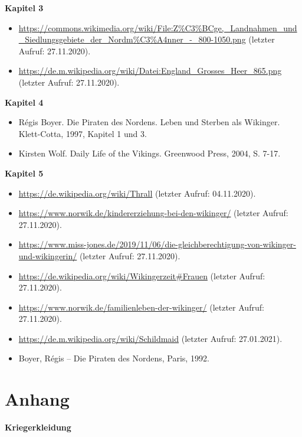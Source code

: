 \documentclass[12pt,a4paper,ngerman,openany]{book}
\newcommand\blankpage{\null \thispagestyle{empty} \addtocounter{page}{-1} \newpage}
\newcommand{\timage}[1]{\framebox{\texttt{[image: \#1]}}} %
\begin{document}
\textbf{Kapitel 3}
\begin{itemize}
  \item \url{https://commons.wikimedia.org/wiki/File:Z\%C3\%BCge,_Landnahmen_und_Siedlungsgebiete_der_Nordm\%C3\%A4nner_-_800-1050.png} (letzter Aufruf: 27.11.2020).
  \item \url{https://de.m.wikipedia.org/wiki/Datei:England_Grosses_Heer_865.png} (letzter Aufruf: 27.11.2020).
\end{itemize}

\textbf{Kapitel 4}
\begin{itemize}
  \item Régis Boyer. Die Piraten des Nordens. Leben und Sterben als Wikinger. Klett-Cotta, 1997, Kapitel 1 und 3.
  \item Kirsten Wolf. Daily Life of the Vikings. Greenwood Press, 2004, S. 7-17.
\end{itemize}

\textbf{Kapitel 5}
\begin{itemize}
  \item \url{https://de.wikipedia.org/wiki/Thrall} (letzter Aufruf: 04.11.2020).
  \item \url{https://www.norwik.de/kindererziehung-bei-den-wikinger/} (letzter Aufruf: 27.11.2020).
  \item \url{https://www.miss-jones.de/2019/11/06/die-gleichberechtigung-von-wikinger-und-wikingerin/} (letzter Aufruf: 27.11.2020).
  \item \url{https://de.wikipedia.org/wiki/Wikingerzeit#Frauen} (letzter Aufruf: 27.11.2020).
  \item \url{https://www.norwik.de/familienleben-der-wikinger/} (letzter Aufruf: 27.11.2020).
  \item \url{https://de.m.wikipedia.org/wiki/Schildmaid} (letzter Aufruf: 27.01.2021).
  \item Boyer, Régis – Die Piraten des Nordens, Paris, 1992.
\end{itemize}

\afterpage{\blankpage}
\newpage
\afterpage{\blankpage}

\thispagestyle{empty}
\setlength{\fboxrule}{1pt} %
\setlength{\fboxsep}{5pt} %

\section{Anhang}

\textbf{Kriegerkleidung}\\\\
\timage{schild.jpeg} \vspace{0.5cm} \timage{tunika.jpeg} \vspace{0.5cm} \timage{hemd.jpeg}\\\\
\timage{speer.jpeg} \vspace{0.5cm} \timage{helm.jpeg}
\end{document}
